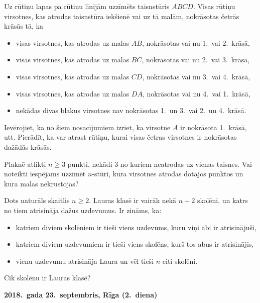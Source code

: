 \documentclass[11pt]{article}
\begin{document}
\begin{problem}[BwTst2018.6]
Uz rūtiņu lapas pa rūtiņu līnijām uzzīmēts taisnstūris $ABCD$. Visas rūtiņu virsotnes, kas 
atrodas taisnstūra iekšienē vai uz tā malām, nokrāsotas četrās krāsās tā, ka 
\begin{itemize}
\item visas virsotnes, kas atrodas uz malas $AB$, nokrāsotas vai nu 1.\ vai 2.\ krāsā,
\item visas virsotnes, kas atrodas uz malas $BC$, nokrāsotas vai nu 2.\ vai 3.\ krāsā, 
\item visas virsotnes, kas atrodas uz malas $CD$, nokrāsotas vai nu 3.\ vai 4.\ krāsā,
\item visas virsotnes, kas atrodas uz malas $DA$, nokrāsotas vai nu 4.\ vai 1.\ krāsā,
\item nekādas divas blakus virsotnes nav nokrāsotas 1.\ un 3.\ vai 2.\ un 4.\ krāsā.
\end{itemize}
Ievērojiet, ka no šiem nosacījumiem izriet, ka virsotne $A$ ir nokrāsota 1.\ krāsā, utt. 
Pierādīt, ka var atrast rūtiņu, kurai visas četras virsotnes ir nokrāsotas dažādās krāsās.
\end{problem}

\begin{problem}[BwTst2018.7]
Plaknē atlikti $n \geq 3$ punkti, nekādi $3$ no kuriem neatrodas uz vienas taisnes. Vai noteikti
iespējams uzzīmēt $n$-stūri, kura virsotnes atrodas dotajos punktos un kura malas nekrustojas?
\end{problem}

\begin{problem}[BwTst2018.8]
Dots naturāls skaitlis $n \geq 2$. Lauras klasē ir vairāk nekā $n+2$ skolēni, un katrs no tiem atrisināja
dažus uzdevumus. Ir zināms, ka:
\begin{itemize}
\item katriem diviem skolēniem ir tieši viens uzdevums, kuru viņi abi ir atrisinājuši,
\item katriem diviem uzdevumiem ir tieši viens skolēns, kurš tos abus ir atrisinājis,
\item vienu uzdevumu atrisināja Laura un vēl tieši $n$ citi skolēni.
\end{itemize}
Cik skolēnu ir Lauras klasē?
\end{problem}




\begin{center}
{\bf 2018.\ gada 23.\ septembris, Rīga (2.\ diena)}
\end{center}
\end{document}
